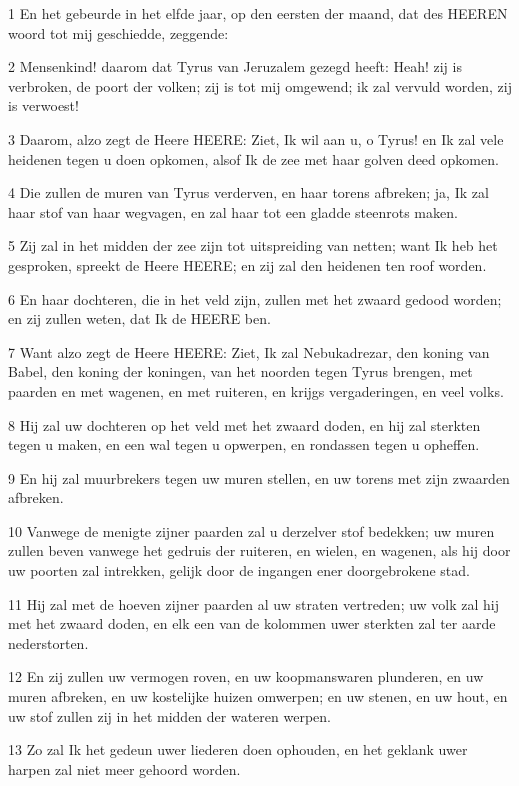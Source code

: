 \par 1 En het gebeurde in het elfde jaar, op den eersten der maand, dat des HEEREN woord tot mij geschiedde, zeggende:
\par 2 Mensenkind! daarom dat Tyrus van Jeruzalem gezegd heeft: Heah! zij is verbroken, de poort der volken; zij is tot mij omgewend; ik zal vervuld worden, zij is verwoest!
\par 3 Daarom, alzo zegt de Heere HEERE: Ziet, Ik wil aan u, o Tyrus! en Ik zal vele heidenen tegen u doen opkomen, alsof Ik de zee met haar golven deed opkomen.
\par 4 Die zullen de muren van Tyrus verderven, en haar torens afbreken; ja, Ik zal haar stof van haar wegvagen, en zal haar tot een gladde steenrots maken.
\par 5 Zij zal in het midden der zee zijn tot uitspreiding van netten; want Ik heb het gesproken, spreekt de Heere HEERE; en zij zal den heidenen ten roof worden.
\par 6 En haar dochteren, die in het veld zijn, zullen met het zwaard gedood worden; en zij zullen weten, dat Ik de HEERE ben.
\par 7 Want alzo zegt de Heere HEERE: Ziet, Ik zal Nebukadrezar, den koning van Babel, den koning der koningen, van het noorden tegen Tyrus brengen, met paarden en met wagenen, en met ruiteren, en krijgs vergaderingen, en veel volks.
\par 8 Hij zal uw dochteren op het veld met het zwaard doden, en hij zal sterkten tegen u maken, en een wal tegen u opwerpen, en rondassen tegen u opheffen.
\par 9 En hij zal muurbrekers tegen uw muren stellen, en uw torens met zijn zwaarden afbreken.
\par 10 Vanwege de menigte zijner paarden zal u derzelver stof bedekken; uw muren zullen beven vanwege het gedruis der ruiteren, en wielen, en wagenen, als hij door uw poorten zal intrekken, gelijk door de ingangen ener doorgebrokene stad.
\par 11 Hij zal met de hoeven zijner paarden al uw straten vertreden; uw volk zal hij met het zwaard doden, en elk een van de kolommen uwer sterkten zal ter aarde nederstorten.
\par 12 En zij zullen uw vermogen roven, en uw koopmanswaren plunderen, en uw muren afbreken, en uw kostelijke huizen omwerpen; en uw stenen, en uw hout, en uw stof zullen zij in het midden der wateren werpen.
\par 13 Zo zal Ik het gedeun uwer liederen doen ophouden, en het geklank uwer harpen zal niet meer gehoord worden.
